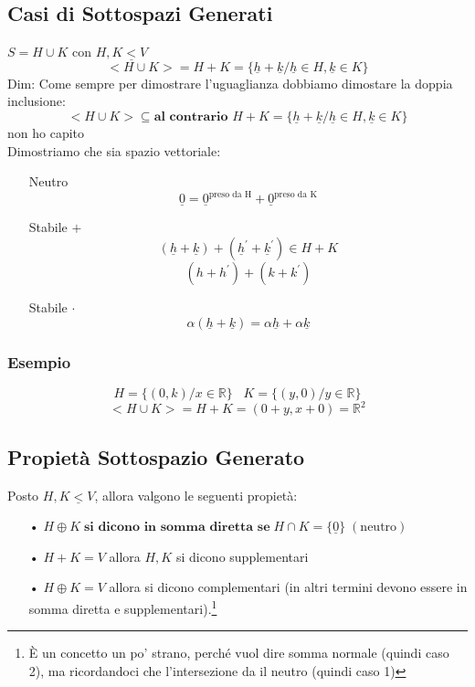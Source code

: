 \subsection{Casi di Sottospazi Generati}

$ S= H \cup K $ con $H,K \underline{<} V$
$$ <H \cup K> = H+K = \{\underline{h}+\underline{k} / \underline{h} \in H, \underline{k} \in K \} $$
Dim:
Come sempre per dimostrare l'uguaglianza dobbiamo dimostare la doppia inclusione:
$$ <H \cup K> \subseteq \textbf{al contrario } H+K = \{\underline{h}+\underline{k} / \underline{h} \in H, \underline{k} \in K \} $$
non ho capito\\

Dimostriamo che sia spazio vettoriale:
\begin{itemize}
\item[Neutro] $$ \underline{0} = \underline{0}^{\text{preso da H}} + \underline{0}^{\text{preso da K}} $$
\item[Stabile $+$] $$ (\underline{h} + \underline{k}) + (\underline{h}^{'} + \underline{k}^{'}) \in H+K $$
$$ (h+h^{'}) + (k+k^{'}) $$
\item[Stabile $\cdot$] $$ \alpha(\underline{h}+\underline{k}) = \alpha\underline{h} + \alpha \underline{k}  $$
\end{itemize}

\subsubsection{Esempio}
$$ H=\{(0,k) / x \in \mathbb{R}\} \;\;\; K=\{(y,0) / y \in \mathbb{R} \} $$
$$ <H \cup K> = H+K = (0+y, x+0) = \mathbb{R}^2 $$

\subsection{Propietà Sottospazio Generato}
Posto $H,K \underline{<} V$, allora valgono le seguenti propietà:
\begin{itemize}
\item[•] $ H \oplus K \; \textbf{si dicono in somma diretta se} \; H \cap K = \{ \underline{0} \} \;(\text{neutro}) $
\item[•] $ H + K = V$ allora $H,K$ si dicono supplementari
\item[•] $ H \oplus K = V$ allora si dicono complementari (in altri termini devono essere in somma diretta e supplementari).\footnote{È un concetto un po' strano, perché vuol dire somma normale (quindi caso 2), ma ricordandoci che l'intersezione da il neutro (quindi caso 1)}
\end{itemize}

